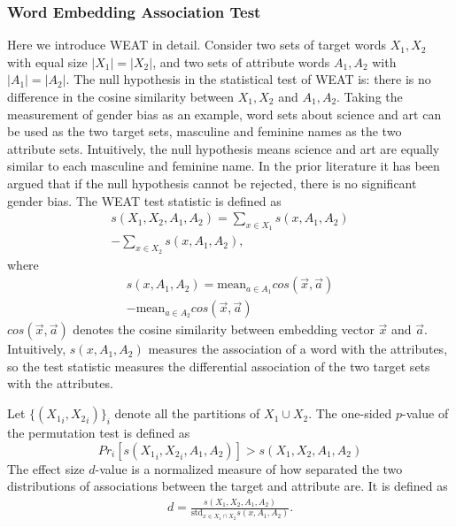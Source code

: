 \subsubsection{Word Embedding Association Test}
\label{sec:weat}
Here we introduce WEAT in detail. Consider two sets of
target words $X_1,X_2$ with equal size $|X_1|=|X_2|$, and
two sets of attribute words $A_1,A_2$ with
$|A_1|=|A_2|$. The null hypothesis in the statistical test
of WEAT is: there is no difference in the cosine similarity
between $X_1,X_2$ and $A_1,A_2$. Taking the measurement of
gender bias as an example, word sets about science and art
can be used as the two target sets, masculine and feminine
names as the two attribute sets. Intuitively, the
null hypothesis means science and art are equally similar to
each masculine and feminine name. In the prior literature
it has been argued that if the null hypothesis cannot be
rejected, there is no significant gender bias.  The WEAT test statistic is defined as
\begin{eqnarray}
s(X_1,X_2,A_1,A_2)=\sum_{x\in X_1}s(x,A_1,A_2)\nonumber\\
-\sum_{x\in X_2}s(x,A_1,A_2),\nonumber
\end{eqnarray}
where
\begin{eqnarray}
s(x,A_1,A_2)=\mbox{mean}_{a\in A_1}cos(\vec{x},\vec{a})\nonumber\\
-\mbox{mean}_{a\in A_2}cos(\vec{x},\vec{a})\nonumber
\end{eqnarray}
$cos(\vec{x},\vec{a})$ denotes the cosine similarity between embedding vector $\vec{x}$ and $\vec{a}$. Intuitively, $s(x,A_1,A_2)$ measures the association of a word with the attributes, so the test statistic measures the differential association of the two target sets with the attributes. 

Let $\{({X_1}_i,{X_2}_i)\}_{i}$ denote all the partitions of $X_1\cup X_2$. The one-sided $p$-value of the permutation test is defined as $$Pr_i[s({X_1}_i,{X_2}_i,A_1,A_2)]>s(X_1,X_2,A_1,A_2)$$
The effect size $d$-value is a normalized measure of how separated the two distributions of associations between the target and attribute are. It is defined as
\begin{eqnarray}
d=\frac{s(X_1,X_2,A_1,A_2)}{\mbox{std}_{x\in X_1 \cap X_2}s(x,A_1,A_2)}.\nonumber
\end{eqnarray}

